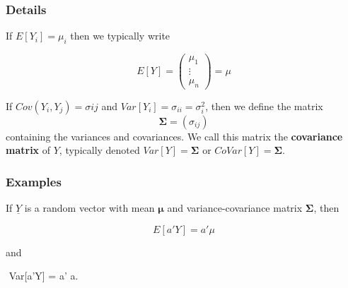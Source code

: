 \documentclass[12pt,a4paper]{article}
\theoremstyle{regla}
\theoremstyle{remark}
\theoremstyle{definition}
\theoremstyle{nonumberbreak}
\begin{document}
\subsubsection{Details}
\begin{defn}
If $E[Y_i] = \mu_i$ then we typically write

$$E[Y]=\left(
\begin{array}{ccc}
  \mu_1 \\
  \vdots \\
  \mu_n
\end{array} \right)=\mu$$

If $Cov(Y_i, Y_j) = \sigma{ij}$ and $Var[Y_i]=\sigma_{ii} = \sigma_i^2$, then we define the matrix $$\boldsymbol{\Sigma} = (\sigma_{ij})$$
containing the variances and covariances. We call this matrix the {\bf covariance matrix} of $Y$, typically denoted $Var[Y] = \boldsymbol{\Sigma}$ or $CoVar[Y] = \boldsymbol{\Sigma}$.
\end{defn}
\subsubsection{Examples}

\begin{xmpl}

If $\underline{Y}$ is a random vector with mean $\boldsymbol{\mu}$ and variance-covariance matrix 
$\boldsymbol{\Sigma}$, then

$$
E[a'Y] = a'\mu
$$


and 

$$
Var[a'Y] = a' \boldsymbol{\Sigma} a.
\end{xmpl}
\end{document}
